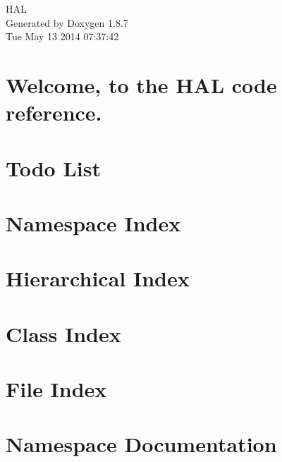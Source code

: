 \documentclass[twoside]{book}
\newcommand{\+}{\discretionary{\mbox{\scriptsize$\hookleftarrow$}}{}{}}
\newcommand{\clearemptydoublepage}{%
  \newpage{\pagestyle{empty}\cleardoublepage}%
}
\begin{document}
\hypersetup{pageanchor=false,
             bookmarks=true,
             bookmarksnumbered=true,
             pdfencoding=unicode
            }
\begin{titlepage}
\vspace*{7cm}
\begin{center}%
{\Large H\+A\+L }\\
\vspace*{1cm}
{\large Generated by Doxygen 1.8.7}\\
\vspace*{0.5cm}
{\small Tue May 13 2014 07:37:42}\\
\end{center}
\end{titlepage}
\clearemptydoublepage
\tableofcontents
\clearemptydoublepage
{}
\hypersetup{pageanchor=true}

\chapter{Welcome, to the H\+A\+L code reference.}
\label{index}\hypertarget{index}{}
\chapter{Todo List}
\label{todo}
\hypertarget{todo}{}

\chapter{Namespace Index}

\chapter{Hierarchical Index}

\chapter{Class Index}

\chapter{File Index}

\chapter{Namespace Documentation}

\end{document}
